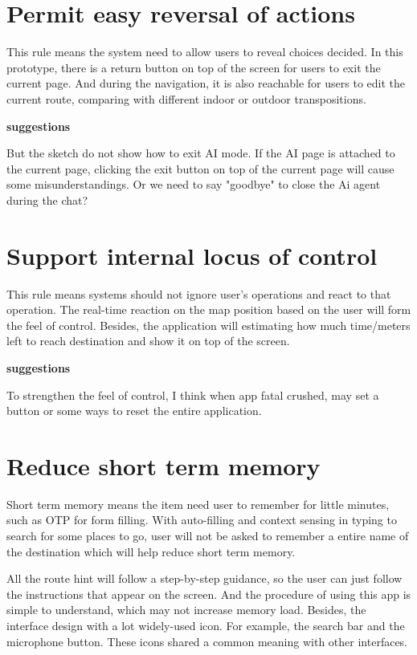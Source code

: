 \documentclass{article}
\begin{document}
	\section{Permit easy reversal of actions}
	
	This rule means the system need to allow users to reveal choices decided. In this prototype, there is a return button on top of the screen for users to exit the current page. And during the navigation, it is also reachable for users to edit the current route, comparing with different indoor or outdoor transpositions.
	
		\textbf{suggestions}
	
	But the sketch do not show how to exit AI mode. If the AI page is attached to the current page, clicking the exit button on top of the current page will cause some misunderstandings. Or we need to say "goodbye" to close the Ai agent during the chat?
	
	\section{Support internal locus of control}
	
	This rule means systems should not ignore user's operations and react to that operation. The real-time reaction on the map position based on the user will form the feel of control. Besides, the application will estimating how much time/meters left to reach destination and show it on top of the screen.
	
		\textbf{suggestions}
	
	To strengthen the feel of control, I think when app fatal crushed, may set a button or some ways to reset the entire application. 
	
	\section{Reduce short term memory}
	
	Short term memory means the item need user to remember for little minutes, such as OTP for form filling.
	With auto-filling and context sensing in typing to search for some places to go, user will not be asked to remember a entire name of the destination which will help reduce short term memory.
	
	All the route hint will follow a step-by-step guidance, so the user can just follow the instructions that appear on the screen. And the procedure of using this app is simple to understand, which may not increase memory load. Besides, the interface design with a lot widely-used icon. For example, the search bar and the microphone button. These icons shared a common meaning with other interfaces.
	
\end{document}
